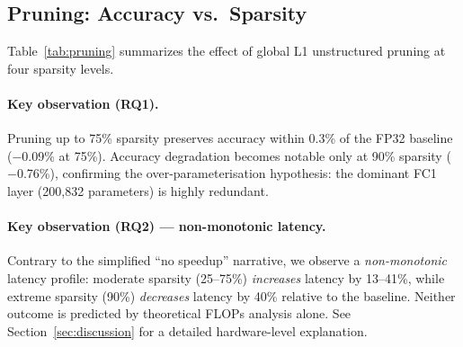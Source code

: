 \subsection{Pruning: Accuracy vs.\ Sparsity}
\label{sec:pruning_results}

Table~\ref{tab:pruning} summarizes the effect of global L1
unstructured pruning at four sparsity levels.

\begin{table}[ht]
\centering
\caption{Pruning sweep results.
$\Delta$Acc: accuracy change relative to FP32 baseline.
FLOPs reduction: theoretical, proportional to sparsity.
Lat.\ change: measured latency relative to baseline.}
\label{tab:pruning}
\small
{}
\end{table}

\paragraph{Key observation (RQ1).}
Pruning up to 75\% sparsity preserves accuracy within 0.3\% of the
FP32 baseline ($-$0.09\% at 75\%).
Accuracy degradation becomes notable only at 90\% sparsity ($-$0.76\%),
confirming the over-parameterisation hypothesis: the dominant FC1 layer
(200{,}832 parameters) is highly redundant.

\paragraph{Key observation (RQ2) — non-monotonic latency.}
Contrary to the simplified ``no speedup'' narrative, we observe a
\emph{non-monotonic} latency profile:
moderate sparsity (25--75\%) \emph{increases} latency by 13--41\%,
while extreme sparsity (90\%) \emph{decreases} latency by 40\%
relative to the baseline.
Neither outcome is predicted by theoretical FLOPs analysis alone.
See Section~\ref{sec:discussion} for a detailed hardware-level explanation.
